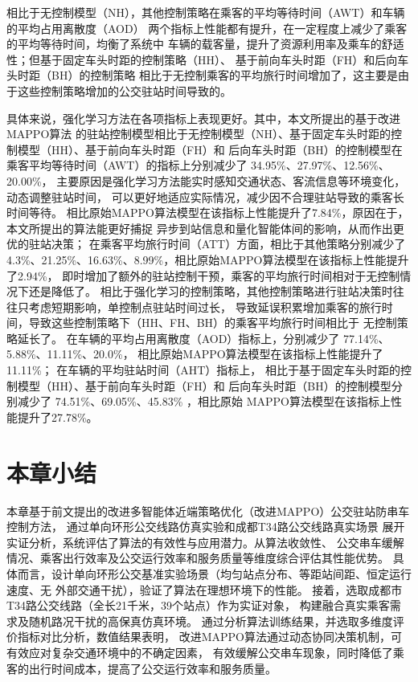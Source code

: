 相比于无控制模型（NH），其他控制策略在乘客的平均等待时间（AWT）和车辆的平均占用离散度（AOD）
两个指标上性能都有提升，在一定程度上减少了乘客的平均等待时间，均衡了系统中
车辆的载客量，提升了资源利用率及乘车的舒适性；但基于固定车头时距的控制策略（HH）、
基于前向车头时距（FH）和后向车头时距（BH）的控制策略
相比于无控制乘客的平均旅行时间增加了，这主要是由于这些控制策略增加的公交驻站时间导致的。

具体来说，强化学习方法在各项指标上表现更好。其中，本文所提出的基于改进MAPPO算法
的驻站控制模型相比于无控制模型（NH）、基于固定车头时距的控制模型（HH）、基于前向车头时距（FH）和
后向车头时距（BH）的控制模型在乘客平均等待时间（AWT）的指标上分别减少了 34.95\%、27.97\%、12.56\%、
20.00\%，
主要原因是强化学习方法能实时感知交通状态、客流信息等环境变化，动态调整驻站时间，
可以更好地适应实际情况，减少因不合理驻站导致的乘客长时间等待。
相比原始MAPPO算法模型在该指标上性能提升了7.84\%，原因在于，本文所提出的算法能更好捕捉
异步到站信息和量化智能体间的影响，从而作出更优的驻站决策；
在乘客平均旅行时间（ATT）方面，相比于其他策略分别减少了
4.3\%、21.25\%、16.63\%、8.99\%，相比原始MAPPO算法模型在该指标上性能提升了2.94\%，
即时增加了额外的驻站控制干预，乘客的平均旅行时间相对于无控制情况下还是降低了。
相比于强化学习的控制策略，其他控制策略进行驻站决策时往往只考虑短期影响，单控制点驻站时间过长，
导致延误积累增加乘客的旅行时间，导致这些控制策略下（HH、FH、BH）的乘客平均旅行时间相比于
无控制策略延长了。
在车辆的平均占用离散度（AOD）指标上，分别减少了 77.14\%、5.88\%、11.11\%、20.0\%，
相比原始MAPPO算法模型在该指标上性能提升了11.11\%；
在车辆的平均驻站时间（AHT）指标上，
相比于基于固定车头时距的控制模型（HH）、基于前向车头时距（FH）和
后向车头时距（BH）的控制模型分别减少了 74.51\%、69.05\%、45.83\% ，相比原始
MAPPO算法模型在该指标上性能提升了27.78\%。


\section{本章小结}

本章基于前文提出的改进多智能体近端策略优化（改进MAPPO）公交驻站防串车控制方法，
通过单向环形公交线路仿真实验和成都T34路公交线路真实场景
展开实证分析，系统评估了算法的有效性与应用潜力。从算法收敛性、
公交串车缓解情况、乘客出行效率及公交运行效率和服务质量等维度综合评估其性能优势。
具体而言，设计单向环形公交基准实验场景（均匀站点分布、等距站间距、恒定运行速度、无
外部交通干扰），验证了算法在理想环境下的性能。
接着，选取成都市T34路公交线路（全长21千米，39个站点）作为实证对象，
构建融合真实乘客需求及随机路况干扰的高保真仿真环境。
通过分析算法训练结果，并选取多维度评价指标对比分析，数值结果表明，
改进MAPPO算法通过动态协同决策机制，可有效应对复杂交通环境中的不确定因素，
有效缓解公交串车现象，同时降低了乘客的出行时间成本，提高了公交运行效率和服务质量。

